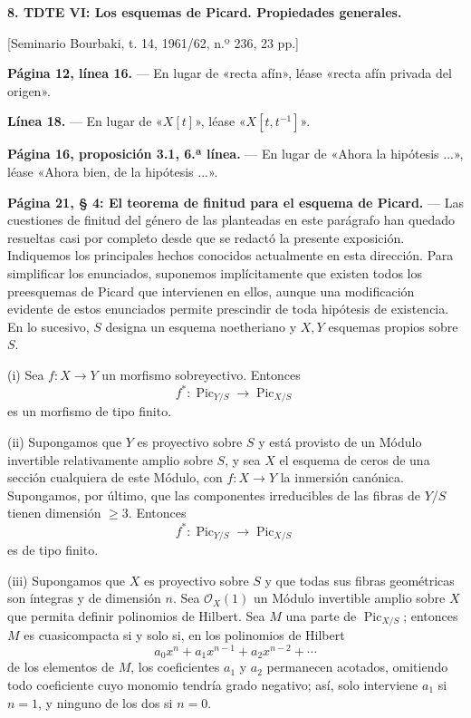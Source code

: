 \documentclass[11pt,twoside,openany]{book}
\numberwithin{equation}{section}
\newcommand{\src}[1]{%
  \phantomsection\hypertarget{src:#1}{}%
  \marginpar{\raggedleft\footnotesize\sffamily #1}%
}
\theoremstyle{plain}
\theoremstyle{definition}
\theoremstyle{remark}
\newcommand{\FgaUnitKey}{frontmatter}
\renewcommand{\src}[1]{%
  \phantomsection\hypertarget{src:\FgaUnitKey:#1}{}%
  \marginpar{\raggedleft\footnotesize\sffamily #1}%
}
\theoremstyle{plain}
\theoremstyle{definition}
\theoremstyle{remark}
\begin{document}
\noindent\textbf{8. TDTE VI: Los esquemas de Picard. Propiedades generales.}

\begin{center}
[Seminario Bourbaki, t. 14, 1961/62, n.º 236, 23 pp.]
\end{center}

\noindent\textbf{Página 12, línea 16.} --- En lugar de «recta afín», léase
«recta afín privada del origen».

\noindent\textbf{Línea 18.} --- En lugar de «$X[t]$», léase
«$X[t,t^{-1}]$».

\noindent\textbf{Página 16, proposición 3.1, 6.ª línea.} --- En lugar de «Ahora
la hipótesis ...», léase «Ahora bien, de la hipótesis ...».

\noindent\textbf{Página 21, § 4: El teorema de finitud para el esquema de
Picard.} --- Las cuestiones de finitud del género de las planteadas en este
parágrafo han quedado resueltas casi por completo desde que se redactó la
presente exposición. Indiquemos los principales hechos conocidos actualmente
en esta dirección. Para simplificar los enunciados, suponemos implícitamente
que existen todos los preesquemas de Picard que intervienen en ellos, aunque
una modificación evidente de estos enunciados permite prescindir de toda
hipótesis de existencia. En lo sucesivo, $S$ designa un esquema noetheriano y
$X,Y$ esquemas propios sobre $S$.

\medskip
\noindent(i) Sea $f:X\longrightarrow Y$ un morfismo sobreyectivo. Entonces
\[
f^*: \operatorname{Pic}_{Y/S}\longrightarrow\operatorname{Pic}_{X/S}
\]
es un morfismo de tipo finito.

\src{304}
\noindent(ii) Supongamos que $Y$ es proyectivo sobre $S$ y está provisto de un
Módulo invertible relativamente amplio sobre $S$, y sea $X$ el esquema de ceros
de una sección cualquiera de este Módulo, con $f:X\longrightarrow Y$ la inmersión
canónica. Supongamos, por último, que las componentes irreducibles de las
fibras de $Y/S$ tienen dimensión $\geq3$. Entonces
\[
f^*: \operatorname{Pic}_{Y/S}\longrightarrow\operatorname{Pic}_{X/S}
\]
es de tipo finito.

\noindent(iii) Supongamos que $X$ es proyectivo sobre $S$ y que todas sus
fibras geométricas son íntegras y de dimensión $n$. Sea $\mathcal O_X(1)$ un
Módulo invertible amplio sobre $X$ que permita definir polinomios de Hilbert. Sea
$M$ una parte de $\operatorname{Pic}_{X/S}$; entonces $M$ es cuasicompacta si
y solo si, en los polinomios de Hilbert
\[
a_0x^n+a_1x^{n-1}+a_2x^{n-2}+\cdots
\]
de los elementos de $M$, los coeficientes $a_1$ y $a_2$ permanecen acotados, omitiendo todo coeficiente cuyo monomio tendría grado negativo; así, solo interviene $a_1$ si $n=1$, y ninguno de los dos si $n=0$.
\end{document}
